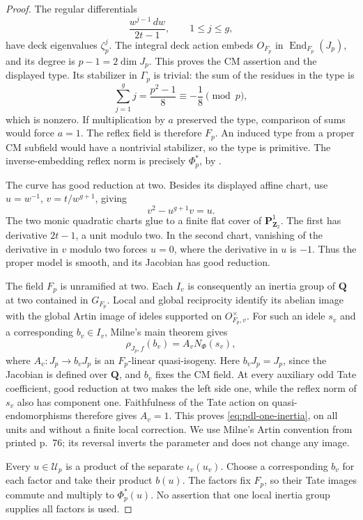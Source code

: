 \begin{proof}
The regular differentials
\[
                   \frac{w^{j-1}\,dw}{2t-1},\qquad 1\le j\le g,
\]
have deck eigenvalues \(\zeta_p^j\). The integral deck
action embeds \(O_{F_p}\) in \(\operatorname{End}_{F_p}(J_p)\),
and its degree is \(p-1=2\dim J_p\). This proves the CM
assertion and the displayed type.
Its stabilizer in \(\Gamma_p\) is trivial: the sum of the
residues in the type is
\[
             \sum_{j=1}^{g}j=\frac{p^2-1}{8}
                                      \equiv-\frac18\pmod p,
\]
which is nonzero. If multiplication by \(a\) preserved
the type, comparison of sums would force \(a=1\).
The reflex field is therefore \(F_p\). An induced type
from a proper CM subfield would have a nontrivial stabilizer,
so the type is primitive. The inverse-embedding reflex norm
is precisely \(\Phi_p^*\), by
\cite[Example 1.19, p.~14; Proposition 1.26, p.~17]{MilneCM2020}.

The curve has good reduction at two. Besides its displayed
affine chart, use \(u=w^{-1}\), \(v=t/w^{g+1}\), giving
\[
                          v^2-u^{g+1}v=u.
\]
The two monic quadratic charts glue to a finite flat cover
of \(\mathbf P^1_{\mathbf Z_2}\). The first has derivative
\(2t-1\), a unit modulo two. In the second chart, vanishing
of the derivative in \(v\) modulo two forces \(u=0\),
where the derivative in \(u\) is \(-1\). Thus the proper
model is smooth, and its Jacobian has good reduction.

The field \(F_p\) is unramified at two. Each \(I_v\)
is consequently an inertia group of \(\mathbf Q\) at two
contained in \(G_{F_p}\). Local and global reciprocity
identify its abelian image with the global Artin image
of ideles supported on \(O_{F_p,v}^\times\).
For such an idele \(s_v\) and a corresponding \(b_v\in I_v\),
Milne's main theorem
\cite[Theorem 9.10, p.~78]{MilneCM2020} gives
\[
                   \rho_{J_p,f}(b_v)=A_v N_\Phi(s_v),
\]
where \(A_v:J_p\to b_vJ_p\) is an \(F_p\)-linear
quasi-isogeny. Here \(b_vJ_p=J_p\), since the Jacobian
is defined over \(\mathbf Q\), and \(b_v\) fixes the CM
field. At every auxiliary odd Tate coefficient, good
reduction at two makes the left side one, while the
reflex norm of \(s_v\) also has component one.
Faithfulness of the Tate action on quasi-endomorphisms
therefore gives \(A_v=1\). This proves
\eqref{eq:pdl-one-inertia}, on all units and without a
finite local correction. We use Milne's Artin convention
from printed p.~76; its reversal inverts the parameter
and does not change any image.

Every \(u\in\mathcal U_p\) is a product of the separate
\(\iota_v(u_v)\). Choose a corresponding \(b_v\) for each
factor and take their product \(b(u)\). The factors fix
\(F_p\), so their Tate images commute and multiply to
\(\Phi_p^*(u)\). No assertion that one local inertia
group supplies all factors is used.
\end{proof}


